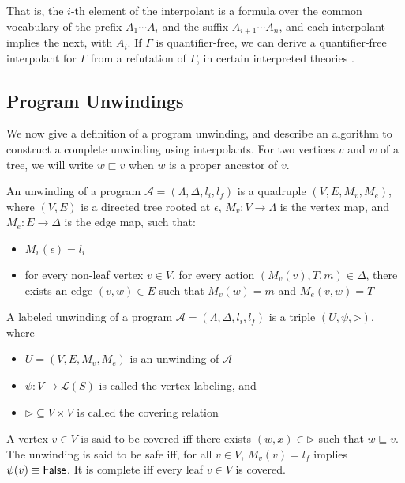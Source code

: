 That is, the $i$-th element of the interpolant is a formula over the common vocabulary of the prefix $A_1 \cdots A_i$ and the suffix $A_{i+1} \cdots A_n$, and each interpolant implies the next, with $A_i$. If $\Gamma$ is quantifier-free, we can derive a quantifier-free interpolant for $\Gamma$ from a refutation of $\Gamma$, in certain interpreted theories \cite{mcmillan05}.

\subsection{Program Unwindings}

We now give a definition of a program unwinding, and describe an algorithm to construct a complete unwinding using interpolants. For two vertices $v$ and $w$ of a tree, we will write $w \sqsubset v$ when $w$ is a proper ancestor of $v$.

\begin{defn}
  \label{defn:prog-unwinding}
  An unwinding of a program $\mathcal{A} = (\Lambda, \Delta, l_i, l_f)$ is a quadruple $(V, E, M_v, M_e)$, where $(V, E)$ is a directed tree rooted at $\epsilon$, $M_v : V \rightarrow \Lambda$ is the vertex map, and $M_e : E \rightarrow \Delta$ is the edge map, such that:

  \begin{itemize}
    \item $M_v(\epsilon) = l_i$
    \item for every non-leaf vertex $v \in V$, for every action $(M_v(v), T, m) \in \Delta$, there exists an edge $(v,w) \in E$ such that $M_v(w) = m$ and $M_e(v,w) = T$
  \end{itemize}
\end{defn}

\begin{defn}
  \label{defn:labeled-prog-unwinding}
  A labeled unwinding of a program $\mathcal{A} = (\Lambda, \Delta, l_i, l_f)$ is a triple $(U, \psi, \rhd)$, where

  \begin{itemize}
    \item $U = (V, E, M_v, M_e)$ is an unwinding of $\mathcal{A}$
    \item $\psi : V \rightarrow \mathcal{L}(S)$ is called the vertex labeling, and
    \item $\rhd \subseteq V \times V$ is called the covering relation
  \end{itemize}

  A vertex $v \in V$ is said to be covered iff there exists $(w,x) \in \rhd$ such that $w \sqsubseteq v$. The unwinding is said to be safe iff, for all $v \in V$, $M_v(v) = l_f$ implies $\psi(v) \equiv \mathsf{False}$. It is complete iff every leaf $v \in V$ is covered.
\end{defn}

